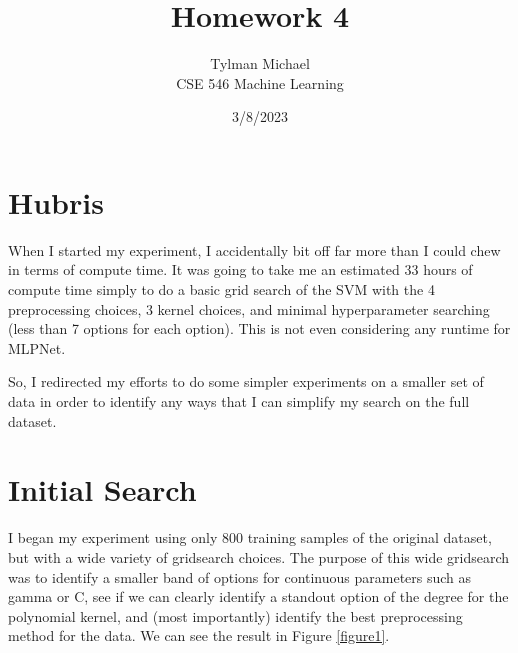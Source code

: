 \documentclass[12pt]{article}
\title{Homework 4}
\author{Tylman Michael\\CSE 546 Machine Learning}
\date{3/8/2023}
\begin{document}
\maketitle{}
\section{Hubris}
When I started my experiment, I accidentally bit off far more than I could chew in terms of compute time. It was going to 
take me an estimated 33 hours of compute time simply to do a basic grid search of the SVM with the 4 preprocessing choices, 
3 kernel choices, and minimal hyperparameter searching (less than 7 options for each option). This is not even considering 
any runtime for MLPNet.

So, I redirected my efforts to do some simpler experiments on a smaller set of data in order to identify any ways that I can 
simplify my search on the full dataset. 
\section{Initial Search}
I began my experiment using only 800 training samples of the original dataset, but with a wide variety of gridsearch choices.
The purpose of this wide gridsearch was to identify a smaller band of options for continuous parameters such as gamma or C,
see if we can clearly identify a standout option of the degree for the polynomial kernel, and (most importantly) identify
the best preprocessing method for the data. We can see the result in Figure \ref{figure1}.
\end{document}
